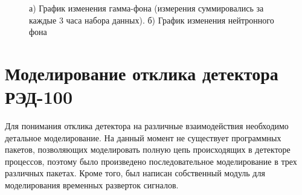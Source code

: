 \begin{figure}[H]
  \begin{minipage}[ht]{0.49\linewidth}
  \end{minipage}
  \hfill
  \begin{minipage}[ht]{0.49\linewidth}
  \end{minipage}
  \caption[Графики изменения гамма и нейтронного фонов.]{а) График изменения гамма-фона (измерения суммировались за каждые 3 часа набора данных). б) График изменения нейтронного фона}
  \label{img:gammaneutronbckg}  
\end{figure}

\section{Моделирование отклика детектора РЭД-100}
\label{sect2_3}
Для понимания отклика детектора на различные взаимодействия необходимо детальное моделирование. На данный момент не существует программных пакетов, позволяющих моделировать полную цепь происходящих в детекторе процессов, поэтому было произведено последовательное моделирование в трех различных пакетах. Кроме того, был написан собственный модуль для моделирования временных разверток сигналов.
